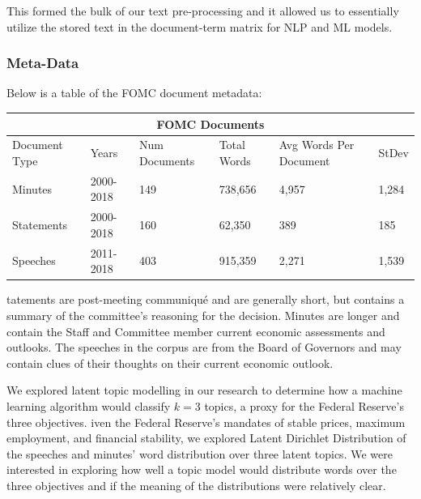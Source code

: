 \documentclass[11pt]{article}
\newcommand{\vertSpace}[1]{\vspace{3mm}}
\begin{document}
{This formed the bulk of our text pre-processing and it allowed us to essentially utilize the stored text in the document-term matrix for NLP and ML models. 

\subsubsection{Meta-Data}
\noindent Below is a table of the FOMC document metadata: 

\vertSpace

\noindent \begin{tabular}{ |p{2cm}||p{2cm}|p{2cm}|p{2cm}|p{2cm}|p{2cm}|  }
 \hline
 \multicolumn{6}{|c|}{FOMC Documents} \\
 \hline
 Document Type& Years & Num Documents & Total Words & Avg Words Per Document & StDev\\
 \hline
 Minutes   & 2000-2018    & 149 & 738,656 & 4,957 & 1,284\\
 Statements &   2000-2018  & 160   & 62,350 & 389 & 185\\
 Speeches & 2011-2018 & 403 & 915,359 & 2,271 & 1,539\\
 \hline
\end{tabular}

\vertSpace

Statements are post-meeting communiqu\'e and are generally short, but contains a summary of the committee's reasoning for the decision.  Minutes are longer and contain the Staff and Committee member current economic assessments and outlooks.  The speeches in the corpus are from the Board of Governors and may contain clues of their thoughts on their current economic outlook.  \vertSpace




\subsection{Latent Dirichlet Allocation}

We explored latent topic modelling in our research to determine how a machine learning algorithm would classify $k=3$ topics, a proxy for the Federal Reserve's three objectives. \vertSpace


Given the Federal Reserve's mandates of stable prices, maximum employment, and financial stability, we explored Latent Dirichlet Distribution of the speeches and minutes' word distribution over three latent topics.  We were interested in exploring how well a topic model would distribute words over the three objectives and if the meaning of the distributions were relatively clear.  

}
\end{document}
